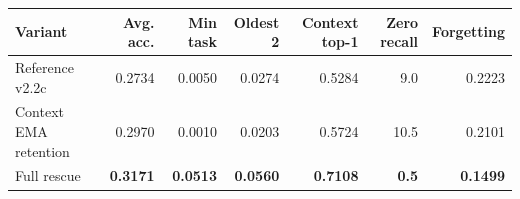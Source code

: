 \begin{tabular}{@{}lrrrrrr@{}}
\toprule
Variant & Avg. acc. & Min task & Oldest 2 & Context top-1 & Zero recall & Forgetting \\
\midrule
Reference v2.2c & 0.2734 & 0.0050 & 0.0274 & 0.5284 & 9.0 & 0.2223 \\
Context EMA retention & 0.2970 & 0.0010 & 0.0203 & 0.5724 & 10.5 & 0.2101 \\
Full rescue & \textbf{0.3171} & \textbf{0.0513} & \textbf{0.0560} & \textbf{0.7108} & \textbf{0.5} & \textbf{0.1499} \\
\bottomrule
\end{tabular}
